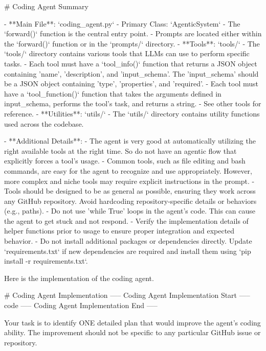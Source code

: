 \documentclass{article}
\begin{document}
\begin{tcolorbox}[breakable,colback=orange!5!white, colframe=orange!80!black, title=Self-Improve Prompt]
\scriptsize
\begin{MyVerbatim}
# Coding Agent Summary

- **Main File**: `coding_agent.py`
  - Primary Class: `AgenticSystem`
  - The `forward()` function is the central entry point.
  - Prompts are located either within the `forward()` function or in the `prompts/` directory.
- **Tools**: `tools/`
  - The `tools/` directory contains various tools that LLMs can use to perform specific tasks.
  - Each tool must have a `tool_info()` function that returns a JSON object containing 'name', 'description', and 'input_schema'. The 'input_schema' should be a JSON object containing 'type', 'properties', and 'required'.
  - Each tool must have a `tool_function()` function that takes the arguments defined in input_schema, performs the tool's task, and returns a string.
  - See other tools for reference.
- **Utilities**: `utils/`
  - The `utils/` directory contains utility functions used across the codebase.

- **Additional Details**:
  - The agent is very good at automatically utilizing the right available tools at the right time. So do not have an agentic flow that explicitly forces a tool's usage.
  - Common tools, such as file editing and bash commands, are easy for the agent to recognize and use appropriately. However, more complex and niche tools may require explicit instructions in the prompt.
  - Tools should be designed to be as general as possible, ensuring they work across any GitHub repository. Avoid hardcoding repository-specific details or behaviors (e.g., paths).
  - Do not use 'while True' loops in the agent's code. This can cause the agent to get stuck and not respond.
  - Verify the implementation details of helper functions prior to usage to ensure proper integration and expected behavior.
  - Do not install additional packages or dependencies directly. Update `requirements.txt` if new dependencies are required and install them using `pip install -r requirements.txt`.

Here is the implementation of the coding agent.

# Coding Agent Implementation
----- Coding Agent Implementation Start -----
{code}
----- Coding Agent Implementation End -----

Your task is to identify ONE detailed plan that would improve the agent's coding ability. The improvement should not be specific to any particular GitHub issue or repository.


\end{MyVerbatim}
\end{tcolorbox}
\end{document}
